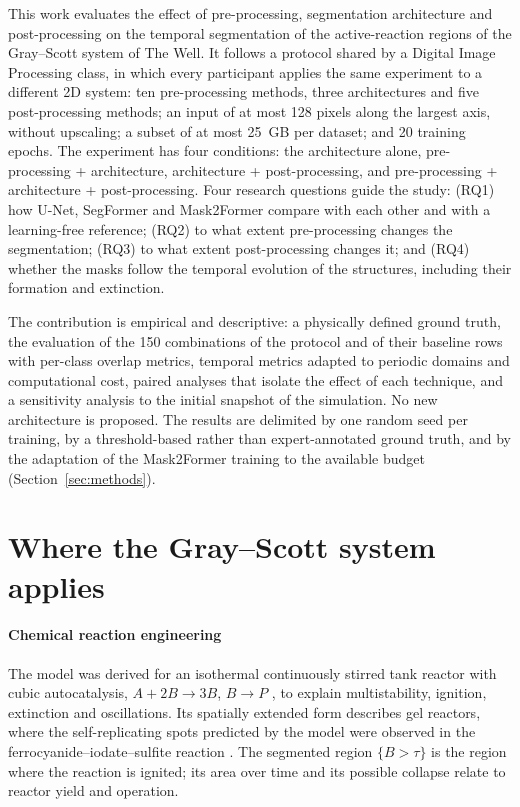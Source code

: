 \documentclass[preprint,12pt,authoryear]{elsarticle}
\begin{document}
This work evaluates the effect of pre-processing, segmentation architecture and post-processing on the temporal segmentation of the active-reaction regions of the Gray--Scott system of The Well. It follows a protocol shared by a Digital Image Processing class, in which every participant applies the same experiment to a different 2D system: ten pre-processing methods, three architectures and five post-processing methods; an input of at most 128 pixels along the largest axis, without upscaling; a subset of at most 25~GB per dataset; and 20 training epochs. The experiment has four conditions: the architecture alone, pre-processing + architecture, architecture + post-processing, and pre-processing + architecture + post-processing. Four research questions guide the study: (RQ1) how U-Net, SegFormer and Mask2Former compare with each other and with a learning-free reference; (RQ2) to what extent pre-processing changes the segmentation; (RQ3) to what extent post-processing changes it; and (RQ4) whether the masks follow the temporal evolution of the structures, including their formation and extinction.

The contribution is empirical and descriptive: a physically defined ground truth, the evaluation of the 150 combinations of the protocol and of their baseline rows with per-class overlap metrics, temporal metrics adapted to periodic domains and computational cost, paired analyses that isolate the effect of each technique, and a sensitivity analysis to the initial snapshot of the simulation. No new architecture is proposed. The results are delimited by one random seed per training, by a threshold-based rather than expert-annotated ground truth, and by the adaptation of the Mask2Former training to the available budget (Section~\ref{sec:methods}).

\section{Where the Gray--Scott system applies}
\label{sec:applications}

\paragraph{Chemical reaction engineering} The model was derived for an isothermal continuously stirred tank reactor with cubic autocatalysis, $A+2B\rightarrow 3B$, $B\rightarrow P$ \citep{gray1983,gray1984}, to explain multistability, ignition, extinction and oscillations. Its spatially extended form describes gel reactors, where the self-replicating spots predicted by the model \citep{pearson1993} were observed in the ferrocyanide--iodate--sulfite reaction \citep{lee1993}. The segmented region $\{B>\tau\}$ is the region where the reaction is ignited; its area over time and its possible collapse relate to reactor yield and operation.
\end{document}
